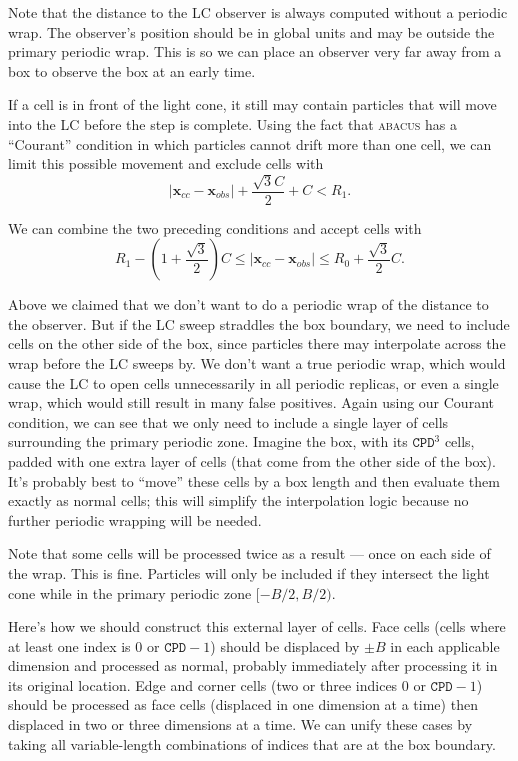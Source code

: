 \documentclass[a4paper]{article}
\newcommand{\abacus}{\textsc{abacus}\xspace}
\newcommand{\bfx}{\ensuremath{\mathbf{x}}}
\newcommand{\CPD}{\ensuremath{\mathtt{CPD}}}
\begin{document}
Note that the distance to the LC observer is always computed without a periodic wrap.  The observer's position should be in global units and may be outside the primary periodic wrap.  This is so we can place an observer very far away from a box to observe the box at an early time.

If a cell is in front of the light cone, it still may contain particles that will move into the LC before the step is complete.  Using the fact that \abacus has a ``Courant'' condition in which particles cannot drift more than one cell, we can limit this possible movement and exclude cells with
\begin{equation}
|\bfx_{cc} - \bfx_{obs}| + \frac{\sqrt{3}C}{2} + C < R_1.
\end{equation}

We can combine the two preceding conditions and accept cells with
\begin{equation}
R_1 - \left(1 + \frac{\sqrt{3}}{2}\right)C \leq |\bfx_{cc} - \bfx_{obs}| \leq R_0 + \frac{\sqrt{3}}{2}C.
\end{equation}

Above we claimed that we don't want to do a periodic wrap of the distance to the observer.  But if the LC sweep straddles the box boundary, we need to include cells on the other side of the box, since particles there may interpolate across the wrap before the LC sweeps by.  We don't want a true periodic wrap, which would cause the LC to open cells unnecessarily in all periodic replicas, or even a single wrap, which would still result in many false positives.  Again using our Courant condition, we can see that we only need to include a single layer of cells surrounding the primary periodic zone.  Imagine the box, with its $\CPD^3$ cells, padded with one extra layer of cells (that come from the other side of the box).  It's probably best to ``move'' these cells by a box length and then evaluate them exactly as normal cells; this will simplify the interpolation logic because no further periodic wrapping will be needed.

Note that some cells will be processed twice as a result --- once on each side of the wrap.  This is fine.  Particles will only be included if they intersect the light cone while in the primary periodic zone $[-B/2, B/2)$.

Here's how we should construct this external layer of cells.  Face cells (cells where at least one index is $0$ or $\CPD-1$) should be displaced by $\pm B$ in each applicable dimension and processed as normal, probably immediately after processing it in its original location.  Edge and corner cells (two or three indices $0$ or $\CPD-1$) should be processed as face cells (displaced in one dimension at a time) then displaced in two or three dimensions at a time.  We can unify these cases by taking all variable-length combinations of indices that are at the box boundary.
\end{document}

